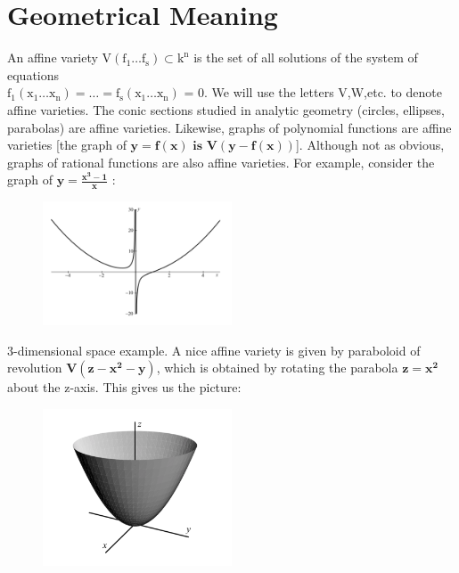 \documentclass[11pt]{article}
\begin{document}
\section{Geometrical Meaning}

An affine variety $\mathrm{V(f_1 \ldots f_s)	\subset k^n}$ is the set of all solutions of the system of equations \\
 $\mathrm{f_1(x_1 \ldots x_n) = \ldots = f_s(x_1 \ldots x_n)}$ = 0. We will use the letters V,W,etc. to denote affine varieties. \cite{coxLittleOshea}
 \newline
 \newline
The conic sections studied in analytic geometry (circles, ellipses, parabolas) are affine varieties. Likewise, graphs of polynomial functions are affine varieties
[the graph of $\mathbf{y= f(x) \text{} \text{ is } \text{} V(y - f(x))}$].
Although not as obvious, graphs of rational functions are also affine varieties. For example, consider the graph of $\mathbf{y= \frac{x^3 -1}{x}}$ :

\begin{figure}[H]
  \begin{center}
    \includegraphics[width=0.50\textwidth]{conic.png}
    \caption{}
    \label{fig: }
  \end{center}
\end{figure}

3-dimensional space example. A nice affine variety is given by
paraboloid of revolution $\mathbf{V(z - x^2 - y)}$, which is obtained by rotating the parabola $\mathbf{z= x^2}$ about the z-axis.
This gives us the picture:

\begin{figure}[H]
  \begin{center}
    \includegraphics[width=0.50\textwidth]{threedimensinoal.png}
    \caption{}
    \label{fig: }
  \end{center}
\end{figure}
\end{document}
